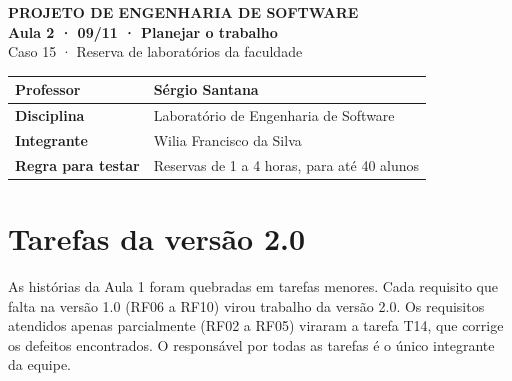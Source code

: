 \documentclass[a4paper,12pt]{article}
\begin{document}
\pagestyle{plain}

\begin{center}
  {\small\bfseries PROJETO DE ENGENHARIA DE SOFTWARE}\\[4pt]
  {\fontsize{16}{20}\selectfont\bfseries Aula 2 · 09/11 · Planejar o trabalho}\\[6pt]
  {\large Caso 15 · Reserva de laboratórios da faculdade}
\end{center}

\vspace{6pt}

\begin{xltabular}{\linewidth}{|l|Y|}
  \hline
  \textbf{Professor} & Sérgio Santana \\ \hline
  \textbf{Disciplina} & Laboratório de Engenharia de Software \\ \hline
  \textbf{Integrante} & Wilia Francisco da Silva \\ \hline
  \textbf{Regra para testar} & Reservas de 1 a 4 horas, para até 40 alunos \\ \hline
\end{xltabular}

\section{Tarefas da versão 2.0}

As histórias da Aula 1 foram quebradas em tarefas menores. Cada
requisito que falta na versão 1.0 (RF06 a RF10) virou trabalho da
versão 2.0. Os requisitos atendidos apenas parcialmente (RF02 a RF05)
viraram a tarefa T14, que corrige os defeitos encontrados. O
responsável por todas as tarefas é o único integrante da equipe.
\end{document}
